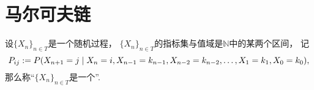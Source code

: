 \section{马尔可夫链}
\begin{definition}
设\(\{X_n\}_{n \in T}\)是一个随机过程，
\(\{X_n\}_{n \in T}\)的指标集与值域是\(\mathbb{N}\)中的某两个区间，
记\begin{equation*}
	P_{ij}
	:=
	P(
		X_{n+1} = j
		\mid
		X_n = i,
		X_{n-1} = k_{n-1},
		X_{n-2} = k_{n-2},
		\dotsc,
		X_1 = k_1,
		X_0 = k_0
	),
\end{equation*}
那么称“\(\{X_n\}_{n \in T}\)是一个”.
\end{definition}
